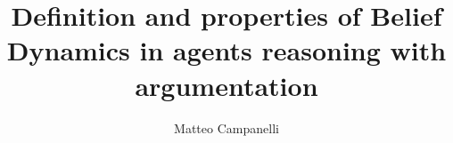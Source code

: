 \documentclass{article}
\title{Definition and properties of Belief Dynamics in agents reasoning with argumentation}
\author{Matteo Campanelli}
\begin{document}
\maketitle
\tableofcontents



\verbatimfont{\itshape\ttfamily}

%

%



%







%

%

%
	
% 


%

%


%

%
%
%




\end{document}
